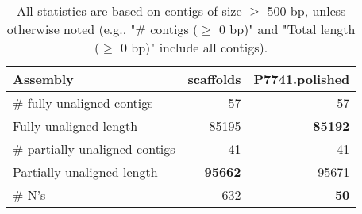 \documentclass[12pt,a4paper]{article}
\begin{document}
\begin{table}[ht]
\begin{center}
\caption{All statistics are based on contigs of size $\geq$ 500 bp, unless otherwise noted (e.g., "\# contigs ($\geq$ 0 bp)" and "Total length ($\geq$ 0 bp)" include all contigs).}
\begin{tabular}{|l*{2}{|r}|}
\hline
Assembly & scaffolds & P7741.polished \\ \hline
\# fully unaligned contigs & 57 & 57 \\ \hline
Fully unaligned length & 85195 & {\bf 85192} \\ \hline
\# partially unaligned contigs & 41 & 41 \\ \hline
Partially unaligned length & {\bf 95662} & 95671 \\ \hline
\# N's & 632 & {\bf 50} \\ \hline
\end{tabular}
\end{center}
\end{table}
\end{document}
